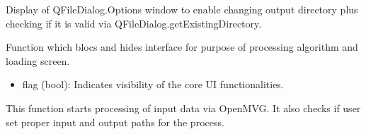 \documentclass[letterpaper,10pt,english]{sphinxmanual}
\begin{document}
\begin{fulllineitems}
\begin{fulllineitems}
\label{\detokenize{main:main.MainWindow.select_output_directory}}
\pysigstartsignatures
{}
\pysigstopsignatures
\sphinxAtStartPar
Display of QFileDialog.Options window to enable changing output directory plus checking if it is valid via
QFileDialog.getExistingDirectory.

\end{fulllineitems}


\begin{fulllineitems}
\label{\detokenize{main:main.MainWindow.set_main_window_status}}
\pysigstartsignatures
{}
\pysigstopsignatures
\sphinxAtStartPar
Function which blocs and hides interface for purpose of processing algorithm and loading screen.
\begin{description}
\begin{itemize}
\item {} 
\sphinxAtStartPar
flag (bool): Indicates visibility of the core UI functionalities.

\end{itemize}

\end{description}

\end{fulllineitems}


\begin{fulllineitems}
\label{\detokenize{main:main.MainWindow.start_process}}
\pysigstartsignatures
{}
\pysigstopsignatures
\sphinxAtStartPar
This function starts processing of input data via OpenMVG. It also checks if user set proper input and output
paths for the process.

\end{fulllineitems}


\begin{fulllineitems}
\label{\detokenize{main:main.MainWindow.staticMetaObject}}
\pysigstartsignatures
{}
\pysigstopsignatures
\end{fulllineitems}


\end{fulllineitems}
\end{document}

